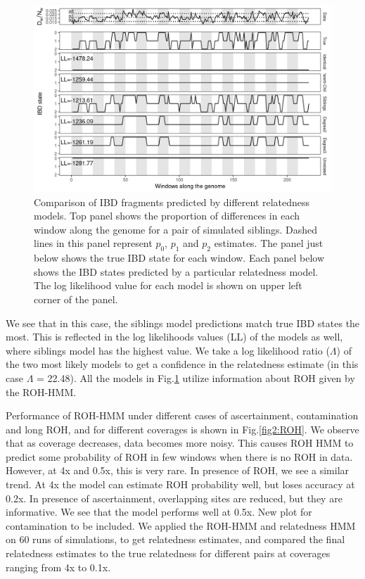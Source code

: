 \documentclass[12pt, letterpaper]{article}
\begin{document}
\begin{figure}[h!]
    \includegraphics[width=16cm]{plots/plotimg/IBDplot.png}
    \centering
    \caption{Comparison of IBD fragments predicted by different relatedness models. Top panel shows the proportion of differences in each window along the genome for a pair of simulated siblings. Dashed lines in this panel represent $p_0$, $p_1$ and $p_2$ estimates. The panel just below shows the true IBD state for each window. Each panel below shows the IBD states predicted by a particular relatedness model. The log likelihood value for each model is shown on upper left corner of the panel. }
    \label{fig1:ibd}
\end{figure}


We see that in this case, the siblings model predictions match true IBD states the most. This is reflected in the log likelihoods values (LL) of the models as well, where siblings model has the highest value. We take a log likelihood ratio ($\Lambda$) of the two most likely models to get a confidence in the relatedness estimate (in this case $\Lambda$ = 22.48). All the models in Fig.\ref{fig1:ibd} utilize information about ROH given by the ROH-HMM. 


Performance of ROH-HMM under different cases of ascertainment, contamination and long ROH, and for different coverages is shown in Fig.\ref{fig2:ROH}. We observe that as coverage decreases, data becomes more noisy. This causes ROH HMM to predict some probability of ROH in few windows when there is no ROH in data. However, at 4x and 0.5x, this is very rare. In presence of ROH, we see a similar trend. At 4x the model can estimate ROH probability well, but loses accuracy at 0.2x. In presence of ascertainment, overlapping sites are reduced, but they are informative. We see that the model performs well at 0.5x. New plot for contamination to be included. We applied the ROH-HMM and relatedness HMM on 60 runs of simulations, to get relatedness estimates, and compared the final relatedness estimates to the true relatedness for different pairs at coverages ranging from 4x to 0.1x. 
\end{document}
